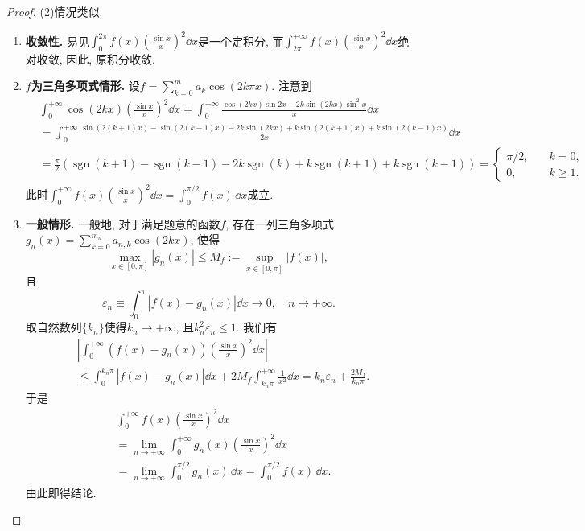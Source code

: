 \begin{a}
\begin{enumerate}
\begin{proof}
(2)情况类似.
\begin{enumerate}[label=(\roman*)]
\def\sgn{\operatorname{sgn}}
\item \textbf{收敛性. }易见\(\int_{0}^{2\pi}f(x)\left(\frac{\sin x}{x}\right)^2\dd x\)是一个定积分, 
而\(\int_{2\pi}^{+\infty}f(x)\left(\frac{\sin x}{x}\right)^2\dd x\)绝对收敛, 
因此, 原积分收敛.
\item \textbf{\(f\)为三角多项式情形. }设\(f=\sum_{k=0}^{m}a_k\cos(2k\pi x)\). 注意到
\[\begin{split}
&\int_{0}^{+\infty}\cos(2kx)\left(\frac{\sin x}{x}\right)^2\dd x
=\int_{0}^{+\infty}\frac{\cos(2kx)\sin 2x-2k\sin(2kx)\sin^2x}{x}\dd x\\
&=\int_{0}^{+\infty}\frac{\sin\left(2(k+1)x\right)-\sin(2(k-1)x)-2k\sin(2kx)+k\sin\left(2(k+1)x\right)+k\sin\left(2(k-1)x\right)}{2x}\dd x\\
&=\frac{\pi}{2}\left(\sgn(k+1)-\sgn(k-1)-2k\sgn(k)+k\sgn(k+1)+k\sgn(k-1)\right)
=\begin{cases}
\pi/2,\quad &k=0,\\
0,\quad &k\geqslant 1.
\end{cases}
\end{split}\]此时\(\int_{0}^{+\infty}f(x)\left(\frac{\sin x}{x}\right)^2\dd x=\int_{0}^{\pi/2}f(x)\,\dd x\)成立.
\item \textbf{一般情形. }一般地, 对于满足题意的函数\(f\), 存在一列三角多项式\(g_n(x)=\sum_{k=0}^{m_n}a_{n,k}\cos(2kx)\), 使得
\[\max_{x\in[0,\pi]}\left|g_n(x)\right|\leqslant M_f:=\sup_{x\in[0,\pi]}\left|f(x)\right|,\]
且\[\varepsilon_n\equiv\int_{0}^{\pi}\left|f(x)-g_n(x)\right|\dd x\rightarrow 0,\quad n\rightarrow+\infty.\]
取自然数列\(\{k_n\}\)使得\(k_n\rightarrow+\infty\), 且\(k_n^2\varepsilon_n\leqslant 1\). 我们有
\begin{align*}
    &\left|\int_{0}^{+\infty}\left(f(x)-g_n(x)\right)\left(\frac{\sin x}{x}\right)^2\dd x\right|\\
    &\leqslant\int_{0}^{k_n\pi}\left|f(x)-g_n(x)\right|\dd x+2M_f\int_{k_n\pi}^{+\infty}\frac{1}{x^2}\dd x
    =k_n\varepsilon_n+\frac{2M_f}{k_n\pi}.
\end{align*}
于是\begin{align*}
    &\int_{0}^{+\infty}f(x)\left(\frac{\sin x}{x}\right)^2\dd x\\
    &=\lim_{n\rightarrow+\infty}\int_{0}^{+\infty}g_n(x)\left(\frac{\sin x}{x}\right)^2\dd x\\
    &=\lim_{n\rightarrow+\infty}\int_{0}^{\pi/2}g_n(x)\,\dd x
    =\int_{0}^{\pi/2}f(x)\,\dd x.
\end{align*}
由此即得结论.\qedhere
\end{enumerate}
\end{proof}


\end{enumerate}
\end{a}
